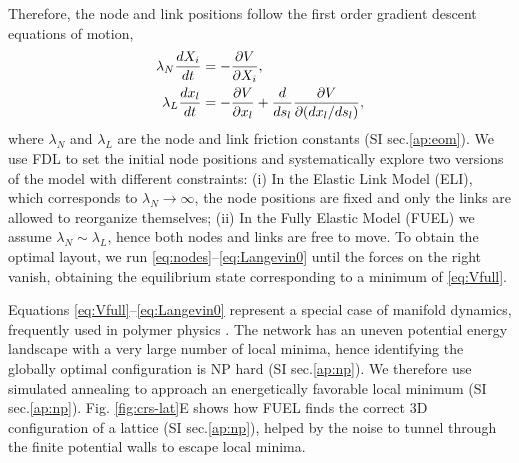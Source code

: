 \documentclass[nofootinbib,preprint,floatfix,titlepage,endfloats,superscriptaddress]{revtex4} %
\begin{document}
Therefore, the node and link positions follow the first order gradient descent equations of motion, 
\begin{align}
    \lambda_N {dX_i\over dt} &= -{\ro V \over \ro X_i} %
    \label{eq:nodes},\\
    \lambda_L {dx_l \over dt} & =  -{\ro V \over \ro x_l} + {d\over ds_l} {\ro V \over \ro (dx_l /ds_l)}   \label{eq:Langevin0},
\end{align}
where $\lambda_N$ and $\lambda_L$ are the node and link friction constants (SI sec.\ref{ap:eom}). 
We use FDL to set the initial node positions and systematically explore two versions of the model with different constraints: 
(i) In the Elastic Link Model (ELI), which corresponds to $\lambda_N\to \infty$, the node positions are fixed and only the links are allowed to reorganize themselves; 
(ii) In the Fully Elastic Model (FUEL) we assume $\lambda_N \sim \lambda_L$, hence both nodes and links are free to move. 
To obtain the optimal layout, we run  \eqref{eq:nodes}--\eqref{eq:Langevin0} until the forces on the right 
vanish, obtaining the equilibrium state corresponding to a minimum of \eqref{eq:Vfull}.

Equations \eqref{eq:Vfull}--\eqref{eq:Langevin0} represent a special case of manifold dynamics, frequently used in polymer physics \cite{mezard1991replica}. 
The network has an uneven potential energy landscape \cite{parisi2002physical} with a very large number of local minima, hence identifying the globally optimal configuration is NP hard (SI sec.\ref{ap:np}).
We therefore use simulated annealing \cite{hwang1988simulated} to approach an energetically favorable local minimum (SI sec.\ref{ap:np}). 
Fig. \ref{fig:crs-lat}E shows how FUEL finds the correct 3D configuration of a lattice (SI sec.\ref{ap:np}), helped by the noise to tunnel through the finite potential walls to escape local minima. 
\end{document}
